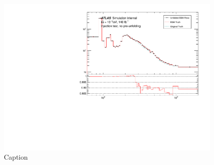 \begin{figure}
    \centering
    \includegraphics{Figures/m4l/InjectionTests/heavyH_unfolded.pdf}
    \caption{Caption}
    \label{fig:injectiontest}
\end{figure}
